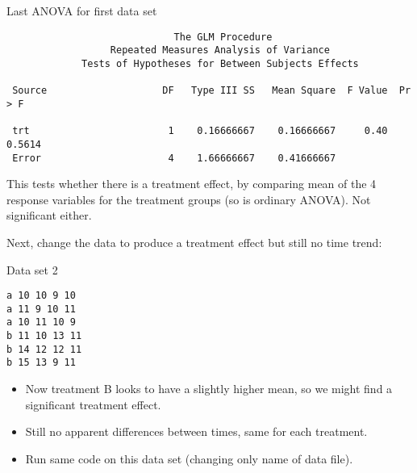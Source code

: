 \documentclass[pdf]{prosper}
\begin{document}
  \begin{slide}{Last ANOVA for first data set}

{\scriptsize
\begin{verbatim}
                             The GLM Procedure
                  Repeated Measures Analysis of Variance
             Tests of Hypotheses for Between Subjects Effects

 Source                    DF   Type III SS   Mean Square  F Value  Pr > F

 trt                        1    0.16666667    0.16666667     0.40  0.5614
 Error                      4    1.66666667    0.41666667                 

\end{verbatim}
}

This tests whether there is a treatment effect, by comparing mean of
the 4 response variables for the treatment groups (so is ordinary
ANOVA). Not significant either.

\vspace{3ex}

Next, change the data to produce a treatment effect but still no time trend:
    
  \end{slide}

  \begin{slide}{Data set 2}

\begin{verbatim}
a 10 10 9 10
a 11 9 10 11
a 10 11 10 9
b 11 10 13 11
b 14 12 12 11
b 15 13 9 11
\end{verbatim}

    \begin{itemize}
    \item Now treatment B looks to have a slightly higher mean, so we might find a significant treatment effect.
    \item Still no apparent differences between times, same for each treatment.
    \item Run same code on this data set (changing only name of data file).
    \end{itemize}


  \end{slide}
\end{document}
